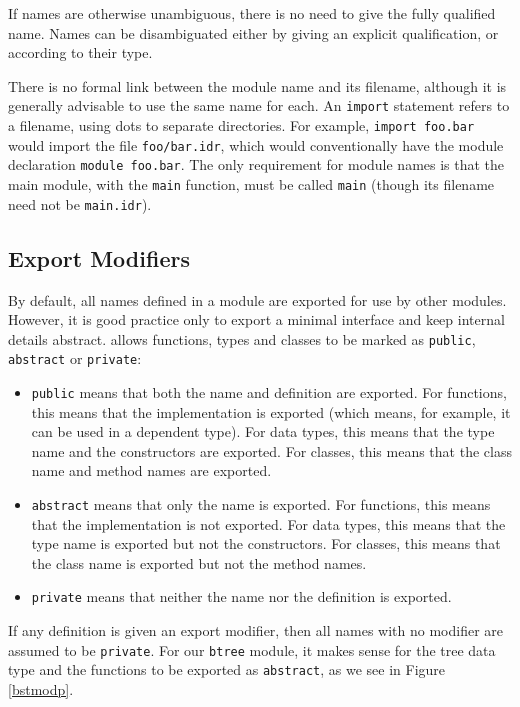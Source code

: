 \noindent
If names are otherwise unambiguous, there is no need to give the fully qualified name.
Names can be disambiguated either by giving an explicit qualification, or according to
their type.

There is no formal link between the module name and its filename, although it is generally
advisable to use the same name for each. An \texttt{import} statement refers to a filename,
using dots to separate directories. For example, \texttt{import foo.bar} would import
the file \texttt{foo/bar.idr}, which would conventionally have the module declaration
\texttt{module foo.bar}. The only requirement for module names is that the main module, with
the \texttt{main} function, must be called \texttt{main} (though its filename need not be
\texttt{main.idr}).

\subsection{Export Modifiers}

By default, all names defined in a module are exported for use by other modules.
However, it is good practice only to export a minimal interface and keep internal
details abstract. \Idris{} allows functions, types and classes to be marked
as \texttt{public}, \texttt{abstract} or \texttt{private}:

\begin{itemize}
\item \texttt{public} means that both the name and definition are exported.
For functions, this means that the implementation is exported (which means, for example,
it can be used in a dependent type). For data types, this means that the type name and
the constructors are exported. For classes, this means that the class name and
method names are exported.
\item \texttt{abstract} means that only the name is exported. For functions, this means
that the implementation is not exported. For data types, this means that the type name
is exported but not the constructors. For classes, this means that the class name is exported
but not the method names.
\item \texttt{private} means that neither the name nor the definition is exported.
\end{itemize}

\noindent
If any definition is given an export modifier, then all names with no modifier are assumed
to be \texttt{private}. For our \texttt{btree} module, it makes sense for the
tree data type and the functions to be exported as \texttt{abstract}, as we see in
Figure \ref{bstmodp}.

